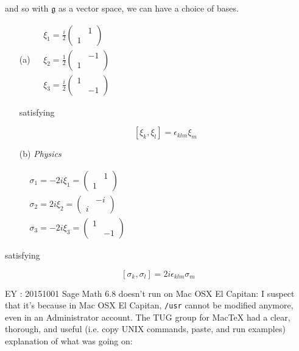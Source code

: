 \documentclass[10pt]{amsart}
\begin{document}
\begin{multicols*}{2}
and so with $\mathfrak{g}$ as a vector space, we can have a choice of bases.  

\begin{enumerate}
	\item[(a)] $\begin{aligned}
	& \xi_1 = \frac{i}{2} \left( \begin{matrix} & 1 \\ 1 & \end{matrix} \right) \\ 
	& \xi_2 = \frac{1}{2} \left( \begin{matrix} & -1 \\ 1 & \end{matrix} \right) \\
	& \xi_3 = \frac{i}{2} \left( \begin{matrix} 1 &  \\  & -1 \end{matrix} \right) 
	\end{aligned}$
	
	satisfying 
	
	\[
	[\xi_k , \xi_l ] = \epsilon_{klm} \xi_m
	\]
	\item[(b)] \emph{Physics}
	
	$\begin{aligned}
	& \sigma_1 = -2i \xi_1 =  \left( \begin{matrix} & 1 \\ 1 & \end{matrix} \right) \\ 
	& \sigma_2 = 2i \xi_2 =  \left( \begin{matrix} & -i \\ i & \end{matrix} \right) \\
	& \sigma_3 = -2i \xi_3 =  \left( \begin{matrix} 1 &  \\  & -1 \end{matrix} \right) 
	\end{aligned}$
\end{enumerate}

satisfying 

\[
[ \sigma_k, \sigma_l ] = 2i \epsilon_{klm} \sigma_m
\]

EY : 20151001 Sage Math 6.8 doesn't run on Mac OSX El Capitan: I suspect that it's because in Mac OSX El Capitan, \verb|/usr| cannot be modified anymore, even in an Administrator account.  The TUG group for MacTeX had a clear, thorough, and useful (i.e. copy UNIX commands, paste, and run examples) explanation of what was going on:


\end{multicols*}
\end{document}
